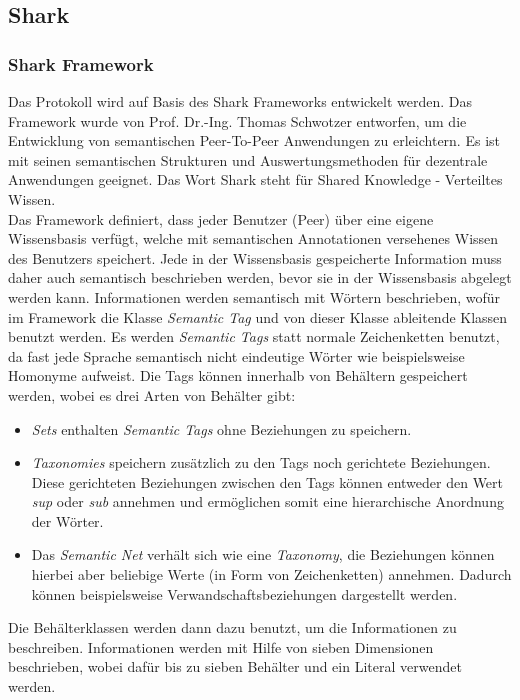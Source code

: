 \subsection{Shark}
\subsubsection{Shark Framework}
Das Protokoll wird auf Basis des Shark Frameworks entwickelt werden. Das Framework wurde von Prof. Dr.-Ing. Thomas Schwotzer entworfen, um die Entwicklung von semantischen Peer-To-Peer Anwendungen zu erleichtern. Es ist mit seinen semantischen Strukturen und Auswertungsmethoden für dezentrale Anwendungen geeignet. Das Wort Shark steht für Shared Knowledge - Verteiltes Wissen.
\\Das Framework definiert, dass jeder Benutzer (Peer) über eine eigene Wissensbasis verfügt, welche mit semantischen Annotationen versehenes Wissen des Benutzers speichert. Jede in der Wissensbasis gespeicherte Information muss daher auch semantisch beschrieben werden, bevor sie in der Wissensbasis abgelegt werden kann. Informationen werden semantisch mit Wörtern beschrieben, wofür im Framework die Klasse \textit{Semantic Tag} und von dieser Klasse ableitende Klassen benutzt werden. Es werden \textit{Semantic Tags} statt normale Zeichenketten benutzt, da fast jede Sprache semantisch nicht eindeutige Wörter wie beispielsweise Homonyme aufweist. Die Tags können innerhalb von Behältern gespeichert werden, wobei es drei Arten von Behälter gibt:
\begin{itemize}
	\item \textit{Sets} enthalten \textit{Semantic Tags} ohne Beziehungen zu speichern.
	\item \textit{Taxonomies} speichern zusätzlich zu den Tags noch gerichtete Beziehungen. Diese gerichteten Beziehungen zwischen den Tags können entweder den Wert \textit{sup} oder \textit{sub} annehmen und ermöglichen somit eine hierarchische Anordnung der Wörter.
	\item Das \textit{Semantic Net} verhält sich wie eine \textit{Taxonomy}, die Beziehungen können hierbei aber beliebige Werte (in Form von Zeichenketten) annehmen. Dadurch können beispielsweise Verwandschaftsbeziehungen dargestellt werden.
\end{itemize}
Die Behälterklassen werden dann dazu benutzt, um die Informationen zu beschreiben. Informationen werden mit Hilfe von sieben Dimensionen beschrieben, wobei dafür bis zu sieben Behälter und ein Literal verwendet werden.
